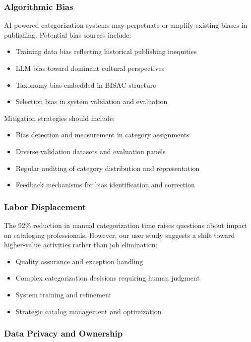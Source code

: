 \documentclass{article}
\begin{document}
\subsubsection{Algorithmic Bias}

AI-powered categorization systems may perpetuate or amplify existing biases in publishing. Potential bias sources include:

\begin{itemize}
\item Training data bias reflecting historical publishing inequities
\item LLM bias toward dominant cultural perspectives
\item Taxonomy bias embedded in BISAC structure
\item Selection bias in system validation and evaluation
\end{itemize}

Mitigation strategies should include:
\begin{itemize}
\item Bias detection and measurement in category assignments
\item Diverse validation datasets and evaluation panels
\item Regular auditing of category distribution and representation
\item Feedback mechanisms for bias identification and correction
\end{itemize}

\subsubsection{Labor Displacement}

The 92\% reduction in manual categorization time raises questions about impact on cataloging professionals. However, our user study suggests a shift toward higher-value activities rather than job elimination:

\begin{itemize}
\item Quality assurance and exception handling
\item Complex categorization decisions requiring human judgment
\item System training and refinement
\item Strategic catalog management and optimization
\end{itemize}

\subsubsection{Data Privacy and Ownership}
\end{document}
